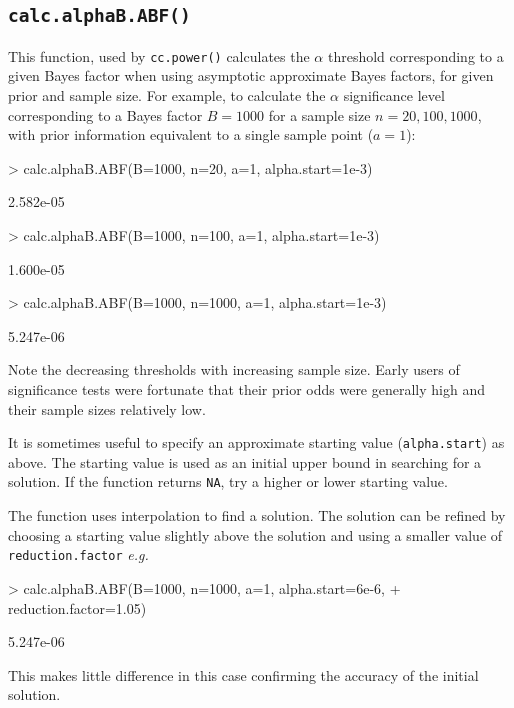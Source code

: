 \documentclass[a4paper,10pt]{amsart}
\def\eg{\textit{e.g.}}
\begin{document}
\subsection{\texttt{calc.alphaB.ABF()}}
This function, used by \texttt{cc.power()} calculates the $\alpha$
threshold corresponding to a given Bayes factor when using asymptotic approximate
Bayes factors, for given prior and sample size. For example, to calculate the
$\alpha$ significance level corresponding to a Bayes factor $B=1000$ for a sample
size $n=20,100,1000$, with prior information equivalent to a single sample point ($a=1$):
\begin{Schunk}
\begin{Sinput}
> calc.alphaB.ABF(B=1000, n=20, a=1, alpha.start=1e-3)
\end{Sinput}
\begin{Soutput}
[1] 2.582e-05
\end{Soutput}
\begin{Sinput}
> calc.alphaB.ABF(B=1000, n=100, a=1, alpha.start=1e-3)
\end{Sinput}
\begin{Soutput}
[1] 1.600e-05
\end{Soutput}
\begin{Sinput}
> calc.alphaB.ABF(B=1000, n=1000, a=1, alpha.start=1e-3)
\end{Sinput}
\begin{Soutput}
[1] 5.247e-06
\end{Soutput}
\end{Schunk}
Note the decreasing thresholds with increasing sample size. 
Early users of significance tests were fortunate that their prior odds
were generally high and their sample sizes relatively low.

It is sometimes useful to specify an approximate starting value
(\texttt{alpha.start}) as above. The starting value is used as an
initial upper bound in searching for a solution. If the function
returns \texttt{NA}, try a higher or lower starting value. 

The function uses interpolation to find a solution.  The solution can
be refined by choosing a starting value slightly above the solution and using a
smaller value of \texttt{reduction.factor} \eg{}  
\begin{Schunk}
\begin{Sinput}
> calc.alphaB.ABF(B=1000, n=1000, a=1, alpha.start=6e-6,
+                 reduction.factor=1.05) 
\end{Sinput}
\begin{Soutput}
[1] 5.247e-06
\end{Soutput}
\end{Schunk}
This makes little difference in this case confirming the accuracy of the
initial solution.
\end{document}
